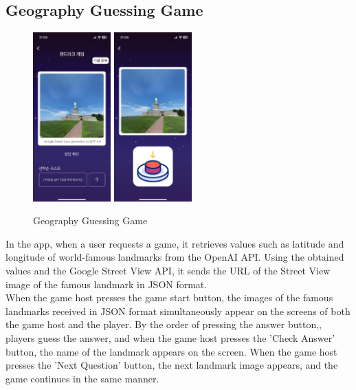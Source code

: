 \documentclass[conference]{IEEEtran}
\begin{document}
    \subsection{Geography Guessing Game}
        \begin{figure}[htbp]
            \centerline{\includegraphics[width=3cm]{Images/screen/game/geo/GEO2_HOST.PNG}
            \includegraphics[width=3cm]{Images/screen/game/geo/GEO2_PLAYER.PNG}}
            \caption{Geography Guessing Game}
            \label{fig}
        \end{figure}
        In the app, when a user requests a game, it retrieves values such as latitude and longitude of world-famous landmarks from the OpenAI API. Using the obtained values and the Google Street View API, it sends the URL of the Street View image of the famous landmark in JSON format.\\
        When the game host presses the game start button, the images of the famous landmarks received in JSON format simultaneously appear on the screens of both the game host and the player. By the order of pressing the answer button,, players guess the answer, and when the game host presses the 'Check Answer' button, the name of the landmark appears on the screen. When the game host presses the 'Next Question' button, the next landmark image appears, and the game continues in the same manner.
\end{document}
